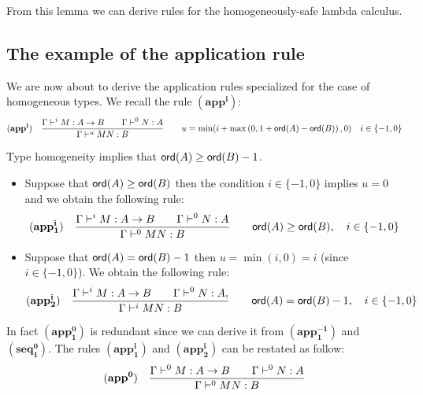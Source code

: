 From this lemma we can derive rules for the homogeneously-safe
lambda calculus.

\subsection{The example of the application rule}

We are now about to derive the application rules specialized for the
case of homogeneous types. We recall the rule $\mathbf{(app^i)}$:
$$ \mathbf{(app^i)} \quad  \frac{\displaystyle \Gamma \vdash^i M : A\rightarrow B
                                        \qquad \Gamma \vdash^{0} N : A}{\Gamma  \vdash^{u} M N : B}
                                    \qquad
                                   u = \min(i+\max\left(0, 1 + {\sf ord}(A) - {\sf ord}(B)\right),0) \quad i \in \{ -1, 0 \} $$

Type homogeneity implies that ${\sf ord}(A) \geq {\sf ord}(B) - 1$.

\begin{itemize}
\item Suppose that ${\sf ord}(A) \geq {\sf ord}(B)$ then the condition $i \in \{-1, 0\}$ implies $u=0$ and we obtain the following rule:
$$ \mathbf{(app_1^i)} \quad  \frac{\displaystyle \Gamma \vdash^i M : A\rightarrow B
                                        \qquad \Gamma \vdash^{0} N : A }{\Gamma  \vdash^{0} M N : B}
                                    \qquad {\sf ord}(A) \geq {\sf ord}(B) ,\quad i \in \{ -1, 0 \} $$

\item Suppose that ${\sf ord}(A) = {\sf ord}(B) - 1$ then
$ u = \min(i,0) = i$  (since $i \in \{-1,0\}$).
 We obtain the following rule:
$$ \mathbf{(app_2^i)} \quad  \frac{\displaystyle \Gamma \vdash^i M : A\rightarrow B
                                        \qquad \Gamma \vdash^{0} N : A,
                                   }{\Gamma  \vdash^i M N : B}
                                    \qquad {\sf ord}(A) = {\sf ord}(B) - 1, \quad i \in \{ -1, 0 \} $$
\end{itemize}

In fact $\mathbf{(app_1^0)}$ is redundant since we can derive it
from $\mathbf{(app_1^{-1})}$ and $\mathbf{(seq^0_1)}$. The rules
$\mathbf{(app_1^i)}$ and $\mathbf{(app_2^i)}$ can be restated as
follow:
$$ \mathbf{(app^0)} \quad  \frac{\displaystyle \Gamma \vdash^0 M : A\rightarrow B
                                        \qquad \Gamma \vdash^{0} N : A }{\Gamma  \vdash^{0} M N : B}$$

